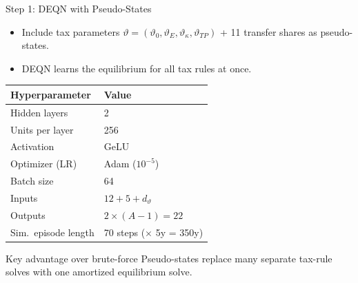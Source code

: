 \documentclass[aspectratio=169,11pt]{beamer}
\newcommand{\emphc}[1]{\textcolor{harvardcrimson}{#1}}
\begin{document}
\begin{frame}{Step 1: DEQN with Pseudo-States}
\footnotesize
\begin{itemize}
    \item Include tax parameters $\vartheta = (\vartheta_0, \vartheta_E, \vartheta_\kappa, \vartheta_{TP})$ + 11 transfer shares as pseudo-states.
    \item DEQN learns the equilibrium for \emphc{all} tax rules at once.
\end{itemize}

\vspace{0.05cm}
\begin{center}
\scriptsize
\begin{tabular}{ll}
\toprule
\textbf{Hyperparameter} & \textbf{Value} \\
\midrule
Hidden layers & 2 \\
Units per layer & 256 \\
Activation & GeLU \\
Optimizer (LR) & Adam ($10^{-5}$) \\
Batch size & 64 \\
Inputs & $12 + 5 + d_\vartheta$ \\
Outputs & $2 \times (A-1) = 22$ \\
Sim.\ episode length & 70 steps ($\times$ 5y = 350y) \\
\bottomrule
\end{tabular}
\end{center}

\vspace{0.05cm}
\begin{exampleblock}{Key advantage over brute-force}
Pseudo-states replace many separate tax-rule solves with one amortized equilibrium solve.
\end{exampleblock}
\end{frame}
\end{document}
